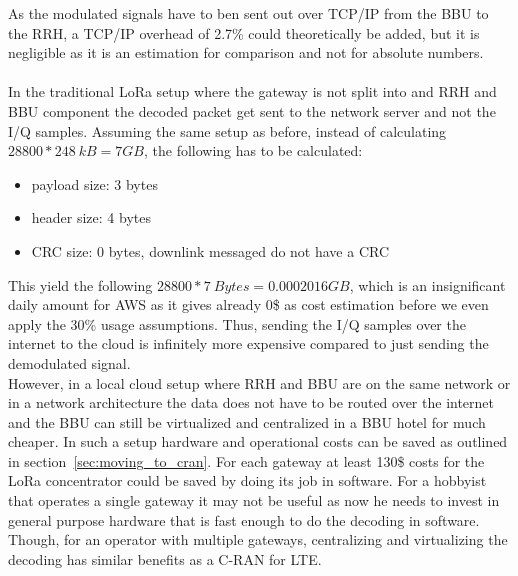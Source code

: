 As the modulated signals have to ben sent out over TCP/IP from the BBU to the RRH, a TCP/IP overhead 
of 2.7\% could theoretically be added, but it is negligible as it is an estimation for 
comparison and not for absolute numbers.
\\
\\
In the traditional LoRa setup where the gateway is not split into and RRH and BBU 
component the decoded packet get sent to the network server and not the I/Q samples.
Assuming the same setup as before, instead of calculating $28800 * 248~kB = 7 GB$, the following
has to be calculated: 

\begin{itemize}
    \item payload size: 3 bytes
    \item header size: 4 bytes
    \item CRC size: 0 bytes, downlink messaged do not have a CRC
\end{itemize}

This yield the following $28800 * 7~Bytes = 0.0002016 GB$, which is an insignificant daily amount for AWS as
it gives already 0\$ as cost estimation before we even apply the 30\% usage assumptions.
Thus, sending the I/Q samples over the internet to the cloud is infinitely more expensive compared to just 
sending the demodulated signal. 
\\
However, in a local cloud setup where RRH and BBU are on the same network
or in a network architecture the data does not have to be routed over the internet and 
the BBU can still be virtualized and centralized in a BBU hotel for much cheaper.
In such a setup hardware and operational costs can be saved as outlined in section~\ref{sec:moving_to_cran}.
For each gateway at least 130\$ costs for the LoRa concentrator could be saved by doing its job in software.
For a hobbyist that operates a single gateway it may not be useful as now he needs to invest in general purpose hardware 
that is fast enough to do the decoding in software. Though, for an operator with multiple gateways, centralizing and virtualizing
the decoding has similar benefits as a C-RAN for LTE.

